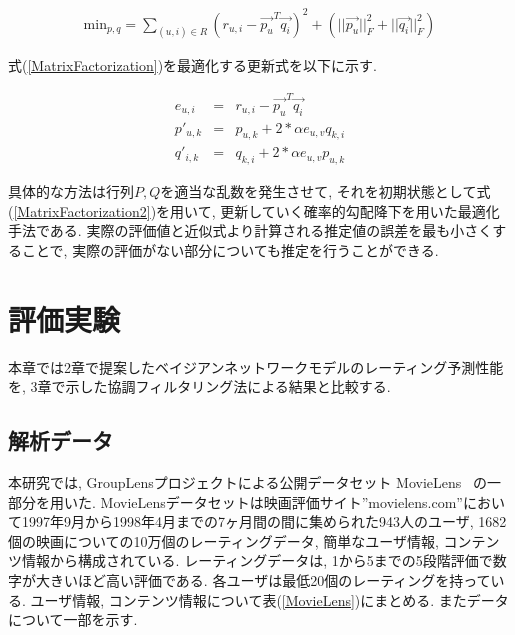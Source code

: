 \documentclass[a4paper]{jarticle}
\begin{document}
\begin{eqnarray}
\label{MatrixFactorization}
\mbox{min}_{p,q} = \sum_{(u, i) \in R} (r_{u, i} - \vec{p_u}^T \vec{q_i})^2 + (||\vec{p_u}||^2_F + ||\vec{q_i}||^2_F)
\end{eqnarray}

式(\ref{MatrixFactorization})を最適化する更新式を以下に示す.

\begin{eqnarray}
\label{MatrixFactorization2}
e_{u, i} &=& r_{u, i} - \vec{p_u}^T \vec{q_i} \\
p'_{u, k} &=& p_{u, k} + 2 * \alpha e_{u, v} q_{k, i} \\
q'_{i, k} &=& q_{k, i} + 2 * \alpha e_{u, v} p_{u, k}
\end{eqnarray}

具体的な方法は行列$P,Q$を適当な乱数を発生させて, それを初期状態として式(\ref{MatrixFactorization2})を用いて, 更新していく確率的勾配降下を用いた最適化手法である. 実際の評価値と近似式より計算される推定値の誤差を最も小さくすることで, 実際の評価がない部分についても推定を行うことができる.

\section{評価実験}

本章では2章で提案したベイジアンネットワークモデルのレーティング予測性能を, 3章で示した協調フィルタリング法による結果と比較する.

\subsection{解析データ}

本研究では, GroupLensプロジェクトによる公開データセット MovieLens~\cite{MovieLens} の一部分を用いた. MovieLensデータセットは映画評価サイト''movielens.com''において1997年9月から1998年4月までの7ヶ月間の間に集められた943人のユーザ, 1682個の映画についての10万個のレーティングデータ, 簡単なユーザ情報, コンテンツ情報から構成されている. レーティングデータは, 1から5までの5段階評価で数字が大きいほど高い評価である. 各ユーザは最低20個のレーティングを持っている. ユーザ情報, コンテンツ情報について表(\ref{MovieLens})にまとめる. またデータについて一部を示す.
\end{document}
